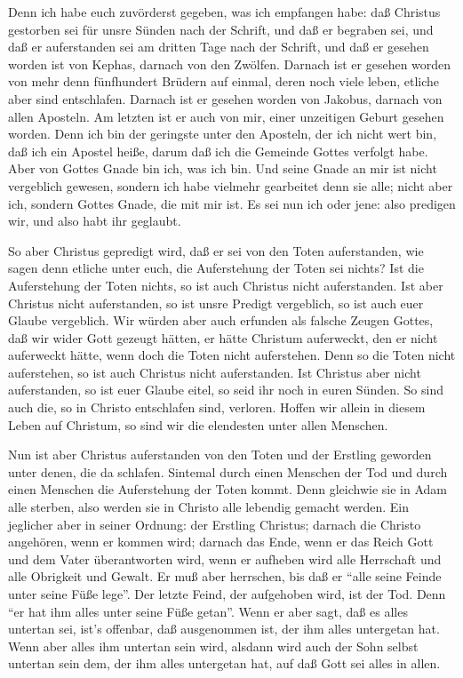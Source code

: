  Denn ich habe euch zuvörderst gegeben, was ich empfangen
habe: daß Christus gestorben sei für unsre Sünden nach der Schrift,
 und daß er begraben sei, und daß er auferstanden sei am
dritten Tage nach der Schrift,  und daß er gesehen worden
ist von Kephas, darnach von den Zwölfen.  Darnach ist er
gesehen worden von mehr denn fünfhundert Brüdern auf einmal, deren noch
viele leben, etliche aber sind entschlafen.  Darnach ist er
gesehen worden von Jakobus, darnach von allen Aposteln.  Am
letzten ist er auch von mir, einer unzeitigen Geburt gesehen worden.
 Denn ich bin der geringste unter den Aposteln, der ich
nicht wert bin, daß ich ein Apostel heiße, darum daß ich die Gemeinde
Gottes verfolgt habe.  Aber von Gottes Gnade bin ich, was
ich bin. Und seine Gnade an mir ist nicht vergeblich gewesen, sondern
ich habe vielmehr gearbeitet denn sie alle; nicht aber ich, sondern
Gottes Gnade, die mit mir ist.  Es sei nun ich oder jene:
also predigen wir, und also habt ihr geglaubt.

 So aber Christus gepredigt wird, daß er sei von den Toten
auferstanden, wie sagen denn etliche unter euch, die Auferstehung der
Toten sei nichts?  Ist die Auferstehung der Toten nichts,
so ist auch Christus nicht auferstanden.  Ist aber Christus
nicht auferstanden, so ist unsre Predigt vergeblich, so ist auch euer
Glaube vergeblich.  Wir würden aber auch erfunden als
falsche Zeugen Gottes, daß wir wider Gott gezeugt hätten, er hätte
Christum auferweckt, den er nicht auferweckt hätte, wenn doch die Toten
nicht auferstehen.  Denn so die Toten nicht auferstehen, so
ist auch Christus nicht auferstanden.  Ist Christus aber
nicht auferstanden, so ist euer Glaube eitel, so seid ihr noch in euren
Sünden.  So sind auch die, so in Christo entschlafen sind,
verloren.  Hoffen wir allein in diesem Leben auf Christum,
so sind wir die elendesten unter allen Menschen.

 Nun ist aber Christus auferstanden von den Toten und der
Erstling geworden unter denen, die da schlafen.  Sintemal
durch einen Menschen der Tod und durch einen Menschen die Auferstehung
der Toten kommt.  Denn gleichwie sie in Adam alle sterben,
also werden sie in Christo alle lebendig gemacht werden. 
Ein jeglicher aber in seiner Ordnung: der Erstling Christus; darnach die
Christo angehören, wenn er kommen wird;  darnach das Ende,
wenn er das Reich Gott und dem Vater überantworten wird, wenn er
aufheben wird alle Herrschaft und alle Obrigkeit und Gewalt.
 Er muß aber herrschen, bis daß er ``alle seine Feinde
unter seine Füße lege''.  Der letzte Feind, der aufgehoben
wird, ist der Tod.  Denn ``er hat ihm alles unter seine
Füße getan''. Wenn er aber sagt, daß es alles untertan sei, ist's
offenbar, daß ausgenommen ist, der ihm alles untergetan hat.
 Wenn aber alles ihm untertan sein wird, alsdann wird auch
der Sohn selbst untertan sein dem, der ihm alles untergetan hat, auf daß
Gott sei alles in allen.

